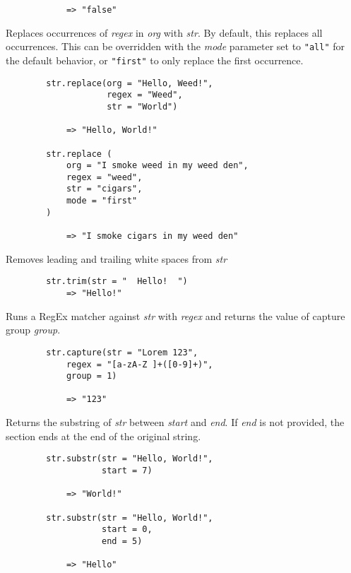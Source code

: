 \begin{multicols*}{2}
\begin{verbatim}
		    => "false"
	\end{verbatim}
	Replaces occurrences of \textit{regex} in \textit{org} with \textit{str}.
	By default, this replaces all occurrences.
	This can be overridden with the \textit{mode} parameter set to \verb|"all"| for the default behavior, or
	\verb|"first"| to only replace the first occurrence.
	\begin{verbatim}
		str.replace(org = "Hello, Weed!",
		            regex = "Weed",
		            str = "World")

		    => "Hello, World!"

		str.replace (
		    org = "I smoke weed in my weed den",
		    regex = "weed",
		    str = "cigars",
		    mode = "first"
		)

		    => "I smoke cigars in my weed den"
	\end{verbatim}
	Removes leading and trailing white spaces from \textit{str}
	\begin{verbatim}
		str.trim(str = "  Hello!  ")
		    => "Hello!"
	\end{verbatim}
	Runs a RegEx matcher against \textit{str} with \textit{regex} and returns the value of capture group \textit{group}.
	\begin{verbatim}
		str.capture(str = "Lorem 123",
            regex = "[a-zA-Z ]+([0-9]+)",
            group = 1)

		    => "123"
	\end{verbatim}
	Returns the substring of \textit{str} between \textit{start} and \textit{end}.
	If \textit{end} is not provided, the section ends at the end of the original string.
	\begin{verbatim}
		str.substr(str = "Hello, World!",
		           start = 7)

		    => "World!"

		str.substr(str = "Hello, World!",
		           start = 0,
		           end = 5)

		    => "Hello"
	\end{verbatim}
\end{multicols*}
\newpage